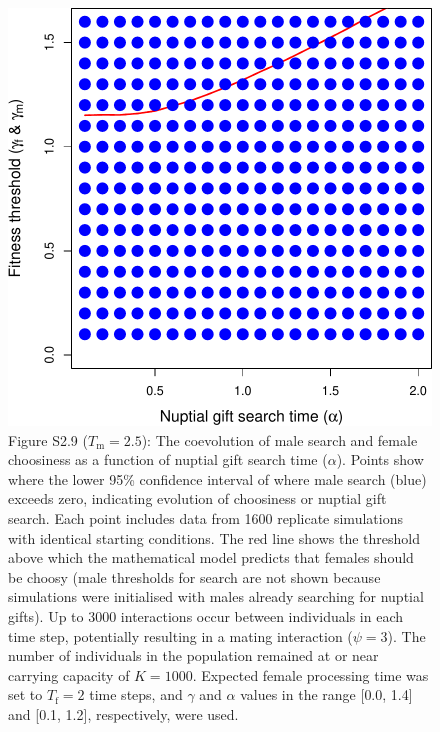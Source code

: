 \documentclass[
]{article}
\begin{document}
\captionsetup{labelformat=default}

\clearpage

\captionsetup{labelformat=empty}

\begin{figure}
\centering
\includegraphics{SI_files/figure-latex/unnamed-chunk-10-1.pdf}
\caption{Figure S2.9 (\(T_{\mathrm{m}} = 2.5\)): The coevolution of male
search and female choosiness as a function of nuptial gift search time
(\(\alpha\)). Points show where the lower 95\% confidence interval of
where male search (blue) exceeds zero, indicating evolution of
choosiness or nuptial gift search. Each point includes data from 1600
replicate simulations with identical starting conditions. The red line
shows the threshold above which the mathematical model predicts that
females should be choosy (male thresholds for search are not shown
because simulations were initialised with males already searching for
nuptial gifts). Up to 3000 interactions occur between individuals in
each time step, potentially resulting in a mating interaction
(\(\psi = 3\)). The number of individuals in the population remained at
or near carrying capacity of \(K = 1000\). Expected female processing
time was set to \(T_{\mathrm{f}}=2\) time steps, and \(\gamma\) and
\(\alpha\) values in the range {[}0.0, 1.4{]} and {[}0.1, 1.2{]},
respectively, were used.}
\end{figure}
\end{document}
